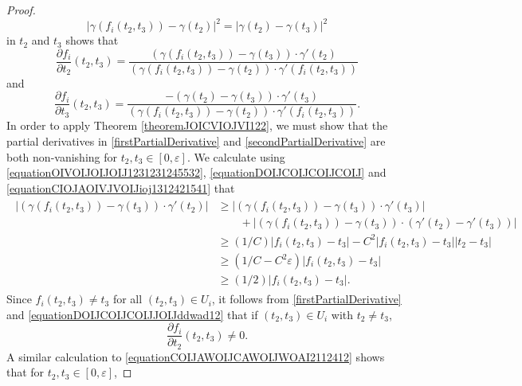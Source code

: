 \documentclass[dvipsnames,letterpaper,12pt]{article}
\numberwithin{equation}{section}
\numberwithin{theorem}{section}
\begin{document}
\begin{proof}
\begin{equation}
        |\gamma(f_i(t_2,t_3)) - \gamma(t_2)|^2 = |\gamma(t_2) - \gamma(t_3)|^2
    \end{equation}
    in $t_2$ and $t_3$ shows that
    \begin{equation} \label{firstPartialDerivative}
        \frac{\partial f_i}{\partial t_2}(t_2,t_3) = \frac{(\gamma(f_i(t_2,t_3)) - \gamma(t_3)) \cdot \gamma'(t_2)}{(\gamma(f_i(t_2,t_3)) - \gamma(t_2)) \cdot \gamma'(f_i(t_2,t_3))}
    \end{equation}
    and
    \begin{equation} \label{secondPartialDerivative}
        \frac{\partial f_i}{\partial t_3}(t_2,t_3) = \frac{- (\gamma(t_2) - \gamma(t_3)) \cdot \gamma'(t_3)}{(\gamma(f_i(t_2,t_3)) - \gamma(t_2)) \cdot \gamma'(f_i(t_2,t_3))}.
    \end{equation}
    In order to apply Theorem \ref{theoremJOICVIOJVI122}, we must show that the partial derivatives in \ref{firstPartialDerivative} and \ref{secondPartialDerivative} are both non-vanishing for $t_2,t_3 \in [0,\varepsilon]$. We calculate using \eqref{equationOIVOIJOIJOIJ1231231245532}, \eqref{equationDOIJCOIJCOIJCOIJ} and \eqref{equationCIOJAOIVJVOIJioj1312421541} that
    \begin{align} \label{equationDOIJCOIJCOIJJOIJddwad12}
    \begin{split}
        |(\gamma(f_i(t_2,t_3)) - \gamma(t_3)) \cdot \gamma'(t_2)| &\geq |(\gamma(f_i(t_2,t_3)) - \gamma(t_3)) \cdot \gamma'(t_3)|\\
        &\quad\quad + |(\gamma(f_i(t_2,t_3)) - \gamma(t_3)) \cdot (\gamma'(t_2) - \gamma'(t_3))|\\
        &\geq (1/C) |f_i(t_2,t_3) - t_3| - C^2 |f_i(t_2,t_3) - t_3||t_2 - t_3|\\
        &\geq (1/C - C^2 \varepsilon) |f_i(t_2,t_3) - t_3|\\
        &\geq (1/2) |f_i(t_2,t_3) - t_3|.
    \end{split}
    \end{align}
    Since $f_i(t_2,t_3) \neq t_3$ for all $(t_2,t_3) \in U_i$, it follows from \eqref{firstPartialDerivative} and \eqref{equationDOIJCOIJCOIJJOIJddwad12} that if $(t_2,t_3) \in U_i$ with $t_2 \neq t_3$,
    \begin{equation} \label{nonvanishingt2derivative}
        \frac{\partial f_i}{\partial t_2}(t_2,t_3) \neq 0.
    \end{equation}
    A similar calculation to \eqref{equationCOIJAWOIJCAWOIJWOAI2112412} shows that for $t_2,t_3 \in [0,\varepsilon]$,

\end{proof}
\end{document}
